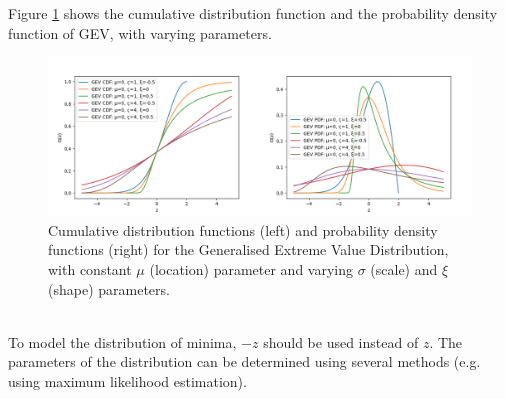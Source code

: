 \documentclass[12pt]{article}
\begin{document}
        Figure \ref{fig:gev} shows the cumulative distribution function and the probability density function of GEV, with varying parameters.\\
        \begin{figure}[t!]
            \centering
            \includegraphics[width=\textwidth]{fig_theory/gev.png}
            \caption{Cumulative distribution functions (left) and probability density functions (right) for the Generalised Extreme Value Distribution, with constant $\mu$ (location) parameter and varying $\sigma$ (scale) and $\xi$ (shape) parameters.}
            \label{fig:gev}
        \end{figure}\\
        To model the distribution of minima, $-z$ should be used instead of $z$. The parameters of the distribution can be determined using several methods (e.g. using maximum likelihood estimation).
\end{document}
